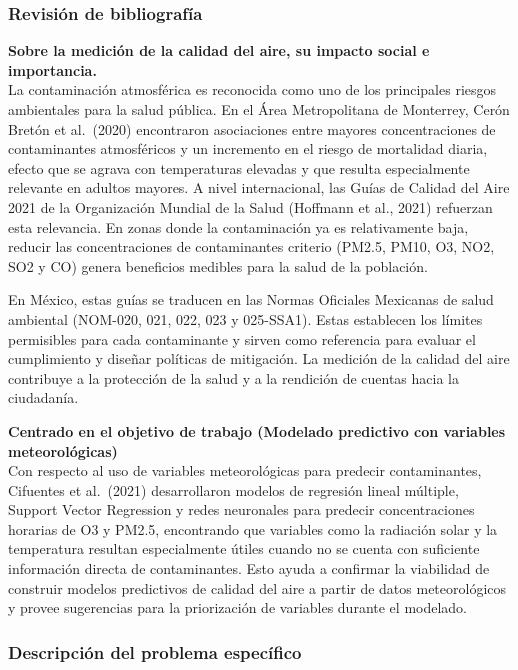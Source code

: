 \documentclass[
  letterpaper,
  DIV=11,
  numbers=noendperiod]{scrartcl}
\begin{document}
\subsubsection{Revisión de
bibliografía}\label{revisiuxf3n-de-bibliografuxeda}

\textbf{Sobre la medición de la calidad del aire, su impacto social e
importancia.}\\
La contaminación atmosférica es reconocida como uno de los principales
riesgos ambientales para la salud pública. En el Área Metropolitana de
Monterrey, Cerón Bretón et al.~(2020) encontraron asociaciones entre
mayores concentraciones de contaminantes atmosféricos y un incremento en
el riesgo de mortalidad diaria, efecto que se agrava con temperaturas
elevadas y que resulta especialmente relevante en adultos mayores. A
nivel internacional, las Guías de Calidad del Aire 2021 de la
Organización Mundial de la Salud (Hoffmann et al., 2021) refuerzan esta
relevancia. En zonas donde la contaminación ya es relativamente baja,
reducir las concentraciones de contaminantes criterio (PM2.5, PM10, O3,
NO2, SO2 y CO) genera beneficios medibles para la salud de la población.

En México, estas guías se traducen en las Normas Oficiales Mexicanas de
salud ambiental (NOM-020, 021, 022, 023 y 025-SSA1). Estas establecen
los límites permisibles para cada contaminante y sirven como referencia
para evaluar el cumplimiento y diseñar políticas de mitigación. La
medición de la calidad del aire contribuye a la protección de la salud y
a la rendición de cuentas hacia la ciudadanía.

\textbf{Centrado en el objetivo de trabajo (Modelado predictivo con
variables meteorológicas)}\\
Con respecto al uso de variables meteorológicas para predecir
contaminantes, Cifuentes et al.~(2021) desarrollaron modelos de
regresión lineal múltiple, Support Vector Regression y redes neuronales
para predecir concentraciones horarias de O3 y PM2.5, encontrando que
variables como la radiación solar y la temperatura resultan
especialmente útiles cuando no se cuenta con suficiente información
directa de contaminantes. Esto ayuda a confirmar la viabilidad de
construir modelos predictivos de calidad del aire a partir de datos
meteorológicos y provee sugerencias para la priorización de variables
durante el modelado.

\subsubsection{Descripción del problema
específico}\label{descripciuxf3n-del-problema-especuxedfico}
\end{document}
